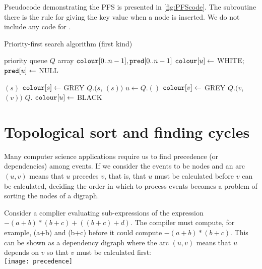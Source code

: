 Pseudocode demonstrating the PFS is presented in
\cref{fig:PFScode}. The subroutine  there is the
rule for giving the key value when a node is inserted. We do not include
any code for .

\begin{algorithm}[H]
  \caption{Priority-first search algorithm (first kind)}
  \label{fig:PFScode}
\begin{algorithmic}[1]
	\State priority queue $Q$  
	\State array $\colour[0..n-1], \pred[0..n-1]$
		\State $\colour[u] \gets $ WHITE; $\pred[u] \gets $ NULL
	\EndFor
	
			\State {}$(s)$
		\EndIf
	\EndFor
	\State \Return{$\pred$}
\EndFunction
{}
	\State $\colour[s] \gets $ GREY 
	\State $Q$.$(s$, $(s))$
		\State $u \gets Q$.$()$
			\State $\colour[v] \gets $ GREY
			\State $Q$.$(v$, $(v))$
		\Else
			\State $Q$.
			\State $\colour[u] \gets$ BLACK
		\EndIf
	\EndWhile
\EndFunction
\end{algorithmic}
\end{algorithm}


\chapter{Topological sort and finding cycles}

Many computer science applications require us to find precedence (or dependencies) among events. If we consider the events to be nodes and an arc $(u,v)$ means that $u$ precedes $v$, that is, that $u$ must be calculated before $v$ can be calculated, deciding the order in which to process events becomes a problem of sorting the nodes of a digraph.

%
\begin{Boxample}[0]
Consider a complier evaluating sub-expressions of the expression $-(a+b) * (b+c) + ((b+c)+d)$.  The compiler must compute, for example, (a+b) and (b+c) before it could compute $-(a+b) * (b+c)$. This can be shown as a dependency digraph where the arc $(u,v)$ means that $u$ depends on $v$ so that $v$ must be calculated first:\\
\texttt{[image: precedence]}
\end{Boxample}

